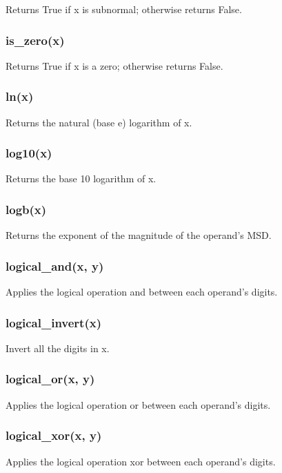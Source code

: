 Returns True if x is subnormal; otherwise returns False.

\subsubsection{is\_zero(x)}

Returns True if x is a zero; otherwise returns False.

\subsubsection{ln(x)}

Returns the natural (base e) logarithm of x.

\subsubsection{log10(x)}

Returns the base 10 logarithm of x.

\subsubsection{logb(x)}

Returns the exponent of the magnitude of the operand's MSD.

\subsubsection{logical\_and(x, y)}

Applies the logical operation and between each operand's digits.

\subsubsection{logical\_invert(x)}

Invert all the digits in x.

\subsubsection{logical\_or(x, y)}

Applies the logical operation or between each operand's digits.

\subsubsection{logical\_xor(x, y)}

Applies the logical operation xor between each operand's digits.

